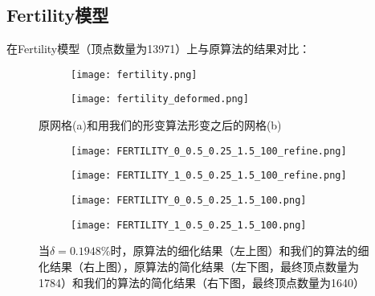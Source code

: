 \subsection{Fertility模型}
在Fertility模型（顶点数量为13971）上与原算法的结果对比：
\begin{figure}[H]
  \centering
  \begin{subfigure}[b]{0.4\textwidth}
    \texttt{[image: fertility.png]}
    \end{subfigure}
    \begin{subfigure}[b]{0.4\textwidth}
      \texttt{[image: fertility\_deformed.png]}
    \end{subfigure}
    \caption[fertility形变结果]{原网格(a)和用我们的形变算法形变之后的网格(b)}
    \label{fig:fertility-deform}
\end{figure}

\begin{figure}[H]
  \centering
  \begin{subfigure}[b]{0.4\textwidth}
    \texttt{[image: FERTILITY\_0\_0.5\_0.25\_1.5\_100\_refine.png]}
  \end{subfigure}
  \begin{subfigure}[b]{0.4\textwidth}
    \texttt{[image: FERTILITY\_1\_0.5\_0.25\_1.5\_100\_refine.png]}
  \end{subfigure}
  \begin{subfigure}[b]{0.4\textwidth}
    \texttt{[image: FERTILITY\_0\_0.5\_0.25\_1.5\_100.png]}
  \end{subfigure}
  \begin{subfigure}[b]{0.4\textwidth}
    \texttt{[image: FERTILITY\_1\_0.5\_0.25\_1.5\_100.png]}
  \end{subfigure}
  \caption[当$\delta=0.1948\%$时fertility结果对比]{当$\delta=0.1948\%$时，原算法的细化结果（左上图）和我们的算法的细化结果（右上图），原算法的简化结果（左下图，最终顶点数量为1784）和我们的算法的简化结果（右下图，最终顶点数量为1640）}
  \label{fig:fertility-res1}
\end{figure}

